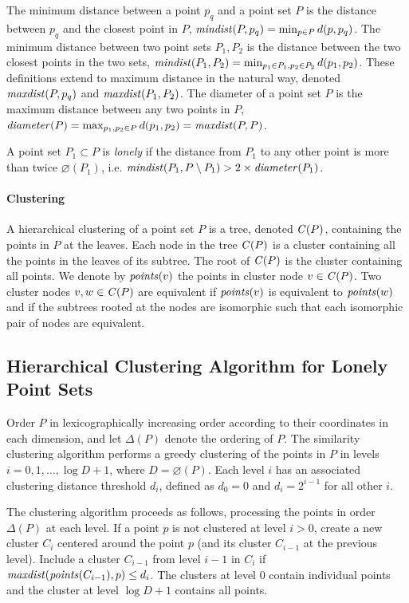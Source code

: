 The minimum distance between a point $p_q$ and a point set $P$ is the distance between $p_q$ and the closest point in $P$, $\mathit{mindist}(P, p_q) = \min_{p \in P} d(p, p_q)$. The minimum distance between two point sets $P_1, P_2$ is the distance between the two closest points in the two sets, $\mathit{mindist}(P_1, P_2) = \min_{p_1 \in P_1, p_2 \in P_2} d(p_1, p_2)$. These definitions extend to maximum distance in the natural way, denoted $\mathit{maxdist}(P, p_q)$ and $\mathit{maxdist}(P_1, P_2)$. The diameter of a point set $P$ is the maximum distance between any two points in $P$, $\mathit{diameter}(P) = \max_{p_1, p_2 \in P} d(p_1, p_2) = \mathit{maxdist}(P, P)$.

A point set $P_1 \subset P$ is \emph{lonely} if the distance from $P_1$ to any other point is more than twice $\diameter(P_1)$, i.e. $\mathit{mindist}(P_1, P \setminus P_1) > 2 \times \mathit{diameter}(P_1)$.

\paragraph{Clustering}
A hierarchical clustering of a point set $P$ is a tree, denoted $\mathit{C}(P)$, containing the points in $P$ at the leaves. Each node in the tree $\mathit{C}(P)$ is a cluster containing all the points in the leaves of its subtree. The root of $\mathit{C}(P)$ is the cluster containing all points. We denote by $\mathit{points}(v)$ the points in cluster node $v \in \mathit{C}(P)$. Two cluster nodes $v, w \in \mathit{C}(P)$ are equivalent if $\mathit{points}(v)$ is equivalent to $\mathit{points}(w)$ and if the subtrees rooted at the nodes are isomorphic such that each isomorphic pair of nodes are equivalent.

\subsection{Hierarchical Clustering Algorithm for Lonely Point Sets}
Order $P$ in lexicographically increasing order according to their coordinates in each dimension, and let $\Delta(P)$ denote the ordering of $P$.
The similarity clustering algorithm performs a greedy clustering of the points in $P$ in levels $i = 0, 1, \ldots, \log D+1$, where $D = \diameter(P)$. Each level $i$ has an associated clustering distance threshold $d_i$, defined as $d_0 = 0$ and $d_i = 2^{i-1}$ for all other $i$.

The clustering algorithm proceeds as follows, processing the points in order $\Delta(P)$ at each level. If a point $p$ is not clustered at level $i > 0$, create a new cluster $C_i$ centered around the point $p$ (and its cluster $C_{i-1}$ at the previous level). Include a cluster $C_{i-1}$ from level $i-1$ in $C_i$ if $\mathit{maxdist}(\mathit{points}(C_{i-1}), p) \leq d_i$. The clusters at level $0$ contain individual points and the cluster at level $\log D+1$ contains all points.

